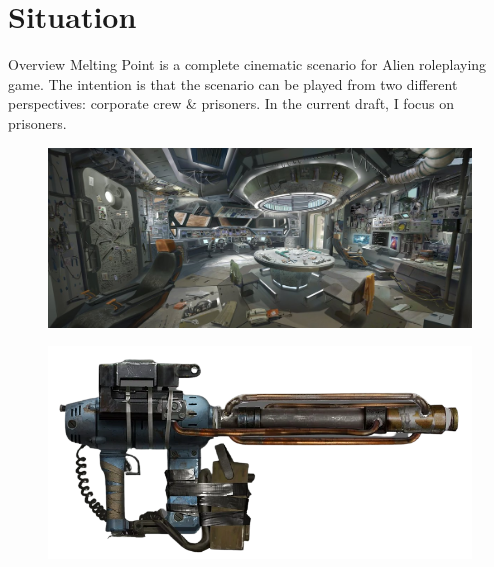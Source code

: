 \chapter{Situation}

\begin{rpg-commentbox}{Overview}
    Melting Point is a complete cinematic scenario for Alien roleplaying game. The intention is that the scenario can be played from two different perspectives: corporate crew \& prisoners. In the current draft, I focus on prisoners.
\end{rpg-commentbox}


\begin{figure}
    \centering
    \includegraphics[width=1.0\textwidth]{img/bg/fire-station.jpg}
\end{figure}


\clearpage

\begin{figure}
    \centering
    \includegraphics[width=1.0\textwidth]{img/bg/boltgun.png}
\end{figure}


